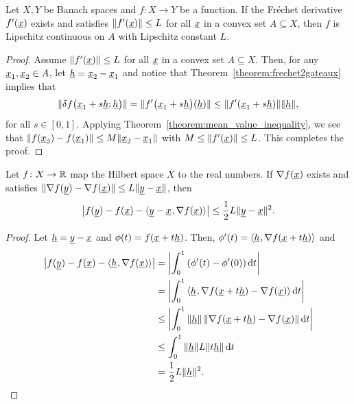 \begin{lemma}
Let $X,Y$ be Banach spaces and $f \colon X \rightarrow Y$ be a function.
If the Fr\'{e}chet derivative $f'(\underline{x})$ exists and satisfies $\| f'(\underline{x})\| \leq L$ for all $\underline{x}$ in a convex set $A\subseteq X$, then $f$ is Lipschitz continuous on $A$ with Lipschitz constant $L$.
\end{lemma}

\begin{proof}
Assume $\| f'(\underline{x})\| \leq L$ for all $\underline{x}$ in a convex set $A\subseteq X$.
Then, for any $\underline{x}_1 , \underline{x}_2 \in A$, let $\underline{h} = \underline{x}_2 - \underline{x}_1$ and notice that Theorem~\ref{theorem:frechet2gateaux} implies that
\[ \| \delta f \big( \underline{x}_1+s\underline{h}; \underline{h}\big) \|  = \| f'\big( \underline{x}_1+s\underline{h} \big)(\underline{h}) \| \leq \| f'(\underline{x}_1 + s \underline{h})\| \|\underline{h} \|, \] 
for all $s\in [0,1]$.
Applying Theorem~\ref{theorem:mean_value_inequality}, we see that $\|f(\underline{x}_2)-f(\underline{x}_1)\| \leq M \| \underline{x}_2 - \underline{x}_1\|$ with $M \leq \| f'(\underline{x})\| \leq L$.
This completes the proof.
\end{proof}

\begin{lemma}
Let $f \colon X \rightarrow \mathbb{R}$ map the Hilbert space $X$ to the real numbers.
If $\nabla f(\underline{x})$ exists and satisfies $ \| \nabla f(\underline{y}) - \nabla f(\underline{x}) \| \leq L \| \underline{y} - \underline{x} \|$, then
\[ \big| f(\underline{y}) - f(\underline{x}) - {\langle \underline{y}-\underline{x}  \mskip1mu ,  \nabla f (\underline{x})  \rangle} \big| \leq \frac{1}{2} L \| \underline{y}-\underline{x} \|^2. \]
\end{lemma}

\begin{proof}
Let $\underline{h} = \underline{y}-\underline{x}$ and $\phi(t) = f(\underline{x} + t \underline{h})$. Then, $\phi'(t) = {\langle  \underline{h}  \mskip1mu ,  \nabla f(\underline{x} + t \underline{h})  \rangle}$ and 
\begin{align*}
\big| f(\underline{y}) -  f(\underline{x}) - {\langle  \underline{h}  \mskip1mu ,  \nabla f(\underline{x})  \rangle} \big| &= \left| \int_{0}^1 \left( \phi'(t) - \phi'(0) \right) \mathrm{d}t \right| \\
&=  \left| \int_{0}^1 {\langle  \underline{h}  \mskip1mu ,  \nabla f(\underline{x} + t \underline{h}) - \nabla f(\underline{x})  \rangle} \, \mathrm{d}t \right| \\
&\leq \left| \int_{0}^1  \| \underline{h} \| \, \| \nabla f(\underline{x} + t \underline{h}) - \nabla f(\underline{x}) \| \, \mathrm{d}t \right| \\
&\leq \int_{0}^1 \|\underline{h} \| L \| t \underline{h} \| \, \mathrm{d}t \\
&= \frac{1}{2} L \| \underline{h} \|^2. \qedhere
\end{align*}
\end{proof}

